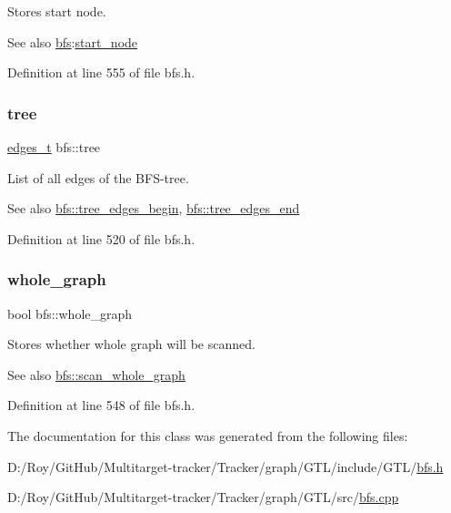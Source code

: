 Stores start node. 

\begin{DoxySeeAlso}{See also}
\mbox{\hyperlink{classbfs}{bfs}}\+:\mbox{\hyperlink{classbfs_a23e2981c2ee617a6e12a8833d2db6210}{start\+\_\+node}} 
\end{DoxySeeAlso}


Definition at line 555 of file bfs.\+h.

\mbox{\label{classbfs_a8bc83afea6d1066ea4ceca3007799912}} 
\subsubsection{\texorpdfstring{tree}{tree}}
{\footnotesize\ttfamily \mbox{\hyperlink{edge_8h_a8f9587479bda6cf612c103494b3858e3}{edges\+\_\+t}} bfs\+::tree\hspace{0.3cm}{\ttfamily [protected]}}



List of all edges of the B\+F\+S-\/tree. 

\begin{DoxySeeAlso}{See also}
\mbox{\hyperlink{classbfs_a56959215efdfee1a37826ad315ac13e7}{bfs\+::tree\+\_\+edges\+\_\+begin}}, \mbox{\hyperlink{classbfs_a7db47d5d68e21e95fd548beea1a8db2b}{bfs\+::tree\+\_\+edges\+\_\+end}} 
\end{DoxySeeAlso}


Definition at line 520 of file bfs.\+h.

\mbox{\label{classbfs_a6c08fbcc90d71f1cbdd03a1cdaa9dc99}} 
\subsubsection{\texorpdfstring{whole\+\_\+graph}{whole\_graph}}
{\footnotesize\ttfamily bool bfs\+::whole\+\_\+graph\hspace{0.3cm}{\ttfamily [protected]}}



Stores whether whole graph will be scanned. 

\begin{DoxySeeAlso}{See also}
\mbox{\hyperlink{classbfs_a25fc51b1bfbbdd3afefe0a84c1bd2f6b}{bfs\+::scan\+\_\+whole\+\_\+graph}} 
\end{DoxySeeAlso}


Definition at line 548 of file bfs.\+h.



The documentation for this class was generated from the following files\+:\begin{DoxyCompactItemize}
\item 
D\+:/\+Roy/\+Git\+Hub/\+Multitarget-\/tracker/\+Tracker/graph/\+G\+T\+L/include/\+G\+T\+L/\mbox{\hyperlink{bfs_8h}{bfs.\+h}}\item 
D\+:/\+Roy/\+Git\+Hub/\+Multitarget-\/tracker/\+Tracker/graph/\+G\+T\+L/src/\mbox{\hyperlink{bfs_8cpp}{bfs.\+cpp}}\end{DoxyCompactItemize}
